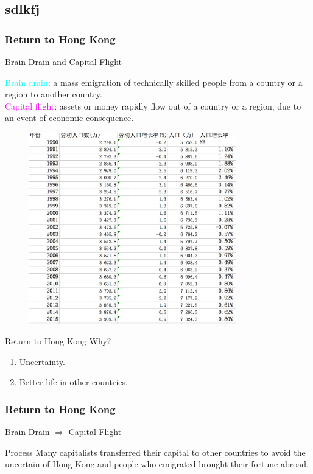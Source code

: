 \documentclass[slidestop,uncompress,mathsans, 12pt]{beamer}
\begin{document}
\subsection{sdlkfj}
\begin{frame}
\frametitle{Return to Hong Kong}
Brain Drain and Capital Flight\\
\begin{definition}
\textcolor{cyan}{Brain drain}: a mass emigration of technically skilled people from a country or a region to another country. \\
\bigskip
\textcolor{magenta}{Capital flight}: assets or money rapidly flow out of a country or a region, due to an event of economic consequence. \\

\end{definition}
\end{frame}
\begin{frame}
\begin{figure}[h]
\centering
\includegraphics[width=0.8\textwidth]{hk15.jpg}
\label{threadsVsSync}
\end{figure}
\end{frame}
\begin{frame}{Return to Hong Kong}
 Why?
\begin{enumerate}
\item Uncertainty.
\bigskip
\item Better life in other countries.
\end{enumerate}
\end{frame}
\begin{frame}
\frametitle{Return to Hong Kong}
Brain Drain $\Longrightarrow$ Capital Flight
%
%
\begin{beamerboxesrounded}[upper=uppercol,lower=lower col,shadow=true]{Process}
Many capitalists transferred their capital to other countries to avoid the uncertain of Hong Kong and people who emigrated brought their fortune abroad.\\
\end{beamerboxesrounded}
\end{frame}
\end{document}
